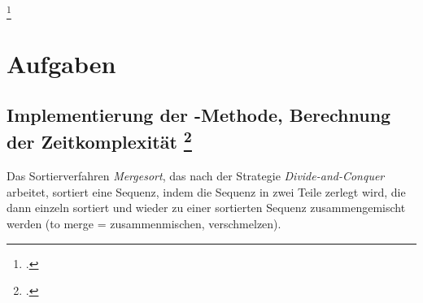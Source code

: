 \documentclass{lehramt-informatik-haupt}
\begin{document}
\footcite[Seite 134 (PDF 152)]{saake}

%

\chapter{Aufgaben}

\section{Implementierung der -Methode, Berechnung der
Zeitkomplexität
\footcite[Seite 2, Aufgabe 3: Mergesort]{aud:ab:7}
}

Das Sortierverfahren \emph{Mergesort}, das nach der Strategie
\emph{Divide-and-Conquer} arbeitet, sortiert eine Sequenz, indem die
Sequenz in zwei Teile zerlegt wird, die dann einzeln sortiert und wieder
zu einer sortierten Sequenz zusammengemischt werden (to merge =
zusammenmischen, verschmelzen).
\end{document}

